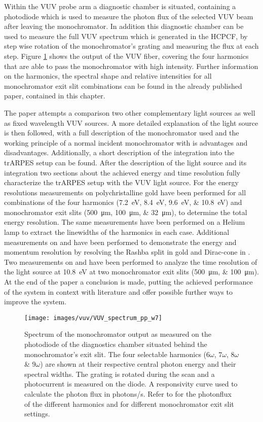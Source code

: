 Within the VUV probe arm a diagnostic chamber is situated, containing a photodiode which is used to measure the photon flux of the selected VUV beam after leaving the monochromator.
In addition this diagnostic chamber can be used to measure the full VUV spectrum which is generated in the HCPCF, by step wise rotation of the monochromator's grating and measuring the flux at each step.
Figure \ref{fig:vuv_spectrum} shows the output of the VUV fiber, covering the four harmonics that are able to pass the monochromator with high intensity.
Further information on the harmonics, the spectral shape and relative intensities for all monochromator exit slit combinations can be found in the already published paper, contained in this chapter.

The paper attempts a comparison two other complementary light sources as well as fixed wavelength VUV sources.
A more detailed explanation of the light source is then followed, with a full description of the monochromator used and the working principle of a normal incident monochromator with is advantages and disadvantages.
Additionally, a short description of the integration into the trARPES setup can be found.
After the description of the light source and its integration two sections about the achieved energy and time resolution fully characterize the trARPES setup with the VUV light source.
For the energy resolutions measurements on polychristalline gold have been performed for all combinations of the four harmonics (\qtylist{7.2;8.4;9.6;10.8}{\electronvolt}) and monochromator exit slits (\qtylist{500;100;32}{\micro\meter}), to determine the total energy resolution.
The same measurements have been performed on a Helium lamp to extract the linewidths of the harmonics in each case.
Additional measurements on  and  have been performed to demonstrate the energy and momentum resolution by resolving the Rashba split in gold and Dirac-cone in .
Two measurements on  and  have been performed to analyze the time resolution of the light source at \qty{10.8}{\electronvolt} at two monochromator exit slits (\qtylist{500;100}{\micro\meter}).
At the end of the paper a conclusion is made, putting the achieved performance of the system in context with literature and offer possible further ways to improve the system.

\begin{figure}[h!]
	\centering
	\texttt{[image: images/vuv/VUV\_spectrum\_pp\_w7]}
	\caption{Spectrum of the monochromator output as measured on the photodiode of the diagnostics chamber situated behind the monochromator's exit slit. The four selectable harmonics ($6\omega$, $7\omega$, $8\omega$ \& $9\omega$) are shown at their respective central photon energy and their spectral widths. The grating is rotated during the scan and a photocurrent is measured on the diode. A responsivity curve used to calculate the photon flux in photons/s. Refer to \cite{hellbruck_high-resolution_2024} for the photonflux of the different harmonics and for different monochromator exit slit settings.}
	\label{fig:vuv_spectrum}
\end{figure}

